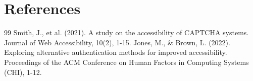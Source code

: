 \documentclass{article}
\begin{document}
\section*{References}
\begin{thebibliography}{99}
 Smith, J., et al. (2021). A study on the accessibility of CAPTCHA systems. Journal of Web Accessibility, 10(2), 1-15.
 Jones, M., & Brown, L. (2022). Exploring alternative authentication methods for improved accessibility. Proceedings of the ACM Conference on Human Factors in Computing Systems (CHI), 1-12.
\end{thebibliography}
\end{document}
